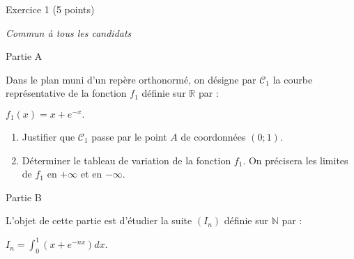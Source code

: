 
%
\begin{h2}Exercice 1 (5 points)\end{h2}
\textit{Commun à tous les candidats}
\begin{h3}Partie A\end{h3}
Dans le plan muni d'un repère orthonormé, on désigne par  $\mathscr C_{1}$ la courbe représentative de la fonction $f_{1}$  définie sur $\mathbb{R}$ par :
\begin{center}$f_{1}\left(x\right)=x+ e^{-x}.$\end{center}
\begin{enumerate}
     \item
     Justifier que $\mathscr C_{1}$ passe par le point $A$ de coordonnées $\left(0 ; 1\right)$.
     \item
     Déterminer le tableau de variation de la fonction $f_{1}$. On précisera les limites de $f_{1}$ en $+ \infty $ et en $-\infty $.
\end{enumerate}
\begin{h3}Partie B\end{h3}
L'objet de cette partie est d'étudier la suite $\left(I_{n}\right)$ définie sur $\mathbb{N}$ par :
\begin{center}$I_{n}=\int_{0}^{1}\left(x+e^{-nx}\right) dx.$\end{center}
